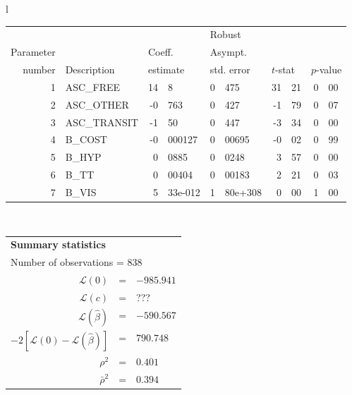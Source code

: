   \begin{tabular}{l}
\begin{tabular}{rlr@{.}lr@{.}lr@{.}lr@{.}l}
         &                       &   \multicolumn{2}{l}{}    & \multicolumn{2}{l}{Robust}  &     \multicolumn{4}{l}{}   \\
Parameter &                       &   \multicolumn{2}{l}{Coeff.}      & \multicolumn{2}{l}{Asympt.}  &     \multicolumn{4}{l}{}   \\
number &  Description                     &   \multicolumn{2}{l}{estimate}      & \multicolumn{2}{l}{std. error}  &   \multicolumn{2}{l}{$t$-stat}  &   \multicolumn{2}{l}{$p$-value}   \\

\hline

1 & ASC\_FREE & 14&8 & 0&475 & 31&21 & 0&00 \\
2 & ASC\_OTHER & -0&763 & 0&427 & -1&79 & 0&07 \\
3 & ASC\_TRANSIT & -1&50 & 0&447 & -3&34 & 0&00 \\
4 & B\_COST & -0&000127 & 0&00695 & -0&02 & 0&99 \\
5 & B\_HYP & 0&0885 & 0&0248 & 3&57 & 0&00 \\
6 & B\_TT & 0&00404 & 0&00183 & 2&21 & 0&03 \\
7 & B\_VIS & 5&33e-012 & 1&80e+308 & 0&00 & 1&00 \\
\hline

\end{tabular}
\\
\begin{tabular}{rcl}
\multicolumn{3}{l}{\bf Summary statistics}\\
\multicolumn{3}{l}{ Number of observations = $838$} \\
 $\mathcal{L}(0)$ &=&  $-985.941$ \\
 $\mathcal{L}(c)$ &=& ???\\
 $\mathcal{L}(\hat{\beta})$ &=& $-590.567 $  \\
 $-2[\mathcal{L}(0) -\mathcal{L}(\hat{\beta})]$ &=& $790.748$ \\
    $\rho^2$ &=&   $0.401$ \\
    $\bar{\rho}^2$ &=&    $0.394$ \\
\end{tabular}
\end{tabular}

